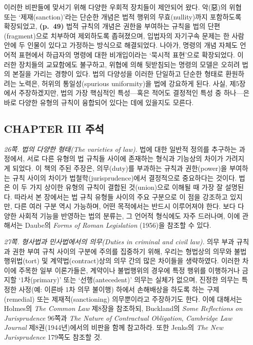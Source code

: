 \documentclass[12pt, oneside]{book}  %
\begin{document}
이러한 비판들에 맞서기 위해 다양한 우회적 장치들이 제안되어 왔다.
악(惡)의 위협 또는 `제재(sanction)'라는 단순한 개념은 법적 행위의
무효(nullity)까지 포함하도록 확장되었고, \textbf{(p.~49)} 법적 규칙의
개념은 권한을 부여하는 규칙을 법의 단편(fragment)으로 치부하여
제외하도록 좁혀졌으며, 입법자의 자기구속 문제는 한 사람 안에 두 인물이
있다고 가정하는 방식으로 해결되었다. 나아가, 명령의 개념 자체도 언어적
표현에서 하급자의 명령에 대한 비개입이라는 `묵시적 표현'으로 확장되었다.
이러한 장치들의 교묘함에도 불구하고, 위협에 의해 뒷받침되는 명령의
모델은 오히려 법의 본질을 가리는 경향이 있다. 법의 다양성을 이러한
단일하고 단순한 형태로 환원하려는 노력은, 허위의 통일성(spurious
uniformity)을 법에 강요하게 된다. 사실, 제5장에서 주장하겠지만, 법의
가장 핵심적인 특성---혹은 적어도 결정적인 특성 중 하나---은 바로 다양한
유형의 규칙이 융합되어 있다는 데에 있을지도 모른다.

\newpage

\subsection{CHAPTER III 주석}\label{chapter-iii-uxc8fcuxc11d}

\emph{26쪽. 법의 다양한 형태(The varieties of law).} 법에 대한 일반적
정의를 추구하는 과정에서, 서로 다른 유형의 법 규칙들 사이에 존재하는
형식과 기능상의 차이가 가려지게 되었다. 이 책의 주된 주장은,
의무(duty)를 부과하는 규칙과 권한(power)을 부여하는 규칙 사이의 차이가
법철학(jurisprudence)에서 결정적으로 중요하다는 것이다. 법은 이 두 가지
상이한 유형의 규칙이 결합된 것(union)으로 이해될 때 가장 잘 설명된다.
따라서 본 장에서는 법 규칙 유형들 사이의 주요 구분으로 이 점을 강조하고
있지만, 다른 여러 구분 역시 가능하며, 어떤 목적에서는 반드시 이루어져야
한다. 보다 다양한 사회적 기능을 반영하는 법의 분류는, 그 언어적 형식에도
자주 드러나며, 이에 관해서는 Daube의 \emph{Forms of Roman Legislation}
(1956)을 참조할 수 있다.

\emph{27쪽. 형사법과 민사법에서의 의무(Duties in criminal and civil
law).} 의무 부과 규칙과 권한 부여 규칙 사이의 구분에 주의를 집중하기
위해, 우리는 형법상의 의무와 불법행위법(tort) 및 계약법(contract)상의
의무 간의 많은 차이들을 생략하였다. 이러한 차이에 주목한 일부
이론가들은, 계약이나 불법행위의 경우에 특정 행위를 이행하거나 금지할
`1차(primary)' 또는 `선행(antecedent)' 의무는 실체가 없으며, 진정한
의무는 특정한 사정(예: 이른바 1차 의무 불이행) 하에서 손해배상을 하도록
하는 구제(remedial) 또는 제재적(sanctioning) 의무뿐이라고 주장하기도
한다. 이에 대해서는 Holmes의 \emph{The Common Law} 제8장을 참조하되,
Buckland의 \emph{Some Reflections on Jurisprudence} 96쪽과 \emph{The
Nature of Contractual Obligation}, \emph{Cambridge Law Journal}
제8권(1944년)에서의 비판을 함께 참고하라. 또한 Jenks의 \emph{The New
Jurisprudence} 179쪽도 참조할 것.
\end{document}
